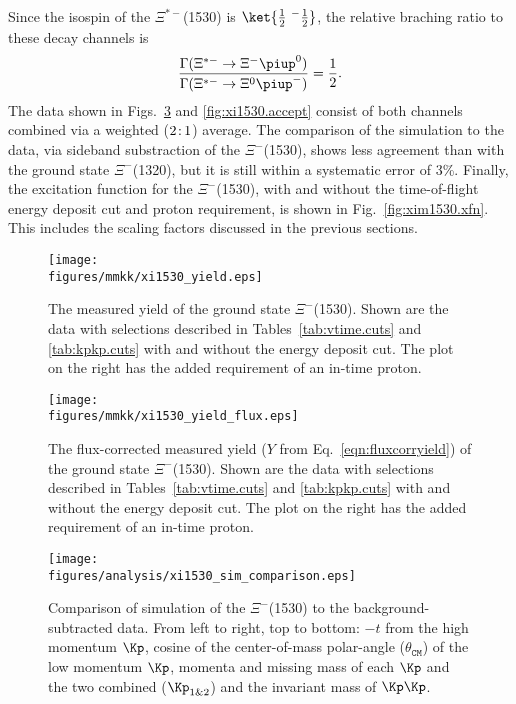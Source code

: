 Since the isospin of the $\Xi^{*-}$(1530) is $\ket{\tfrac{1}{2}\ {}^-\tfrac{1}{2}}$, the relative braching ratio to these decay channels is
\begin{equation}
    \frac{\Gamma(\Xi^{*-}\rightarrow\Xi^{-}\piup^0)}{\Gamma(\Xi^{*-}\rightarrow\Xi^{0}\piup^-)} = \frac{1}{2}.
\end{equation}
The data shown in Figs.~\ref{fig:simcomp.xi1530} and \ref{fig:xi1530.accept} consist of both channels combined via a weighted ($2{\colon\negthinspace} 1$) average. The comparison of the simulation to the data, via sideband substraction of the $\Xi^-$(1530), shows less agreement than with the ground state $\Xi^-$(1320), but it is still within a systematic error of 3\%. Finally, the excitation function for the $\Xi^-$(1530), with and without the time-of-flight energy deposit cut and proton requirement, is shown in Fig.~\ref{fig:xim1530.xfn}. This includes the scaling factors discussed in the previous sections.

\begin{figure}[bhp]\centering
    \texttt{[image: \\figures/mmkk/xi1530\_yield.eps]}
    \caption[\texorpdfstring{$\Xi^-$}{Xi-}(1530) Measured Yield]{\label{fig:xi1530.yield}The measured yield of the ground state $\Xi^-$(1530). Shown are the data with selections described in Tables~\ref{tab:vtime.cuts} and \ref{tab:kpkp.cuts} with and without the  energy deposit cut. The plot on the right has the added requirement of an in-time proton.}
\end{figure}

\begin{figure}[bhpt]\centering
    \texttt{[image: \\figures/mmkk/xi1530\_yield\_flux.eps]}
    \caption[\texorpdfstring{$\Xi^-$}{Xi-}(1530) Measured Yield]{\label{fig:xi1530.yieldflux}The flux-corrected measured yield ($Y$ from Eq.~\ref{eqn:fluxcorryield}) of the ground state $\Xi^-$(1530). Shown are the data with selections described in Tables~\ref{tab:vtime.cuts} and \ref{tab:kpkp.cuts} with and without the  energy deposit cut. The plot on the right has the added requirement of an in-time proton.}
\end{figure}

\begin{figure}[bhpt]\centering
    \texttt{[image: \\figures/analysis/xi1530\_sim\_comparison.eps]}
    \caption[Simulation / Data Comparion \texorpdfstring{$\Xi^-$}{Xi-}(1530)]{\label{fig:simcomp.xi1530}Comparison of simulation of the $\Xi^-$(1530) to the background-subtracted data. From left to right, top to bottom: $-t$ from the high momentum $\Kp$, cosine of the center-of-mass polar-angle ($\theta_\mathtt{CM}$) of the low momentum $\Kp$, momenta and missing mass of each $\Kp$ and the two combined ($\Kp_\mathrm{1\&2}$) and the invariant mass of $\Kp\Kp$.}
\end{figure}

